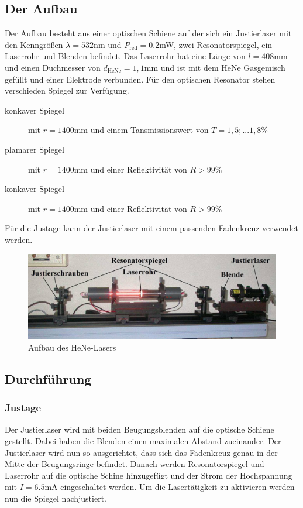 \subsection{Der Aufbau}
Der Aufbau besteht aus einer optischen Schiene auf der sich ein Justierlaser mit den Kenngrößen $\lambda=532$nm und $P_{\text{red}}=0.2$mW, 
zwei Resonatorspiegel, ein Laserrohr und Blenden befindet. Das Laserrohr hat eine Länge von $l=408$mm und einen Duchmesser
von $d_{\text{HeNe}}=1,1$mm und ist mit dem HeNe Gasgemisch gefüllt und einer Elektrode verbunden.
Für den optischen Resonator stehen verschieden Spiegel zur Verfügung.
\begin{description}
    \item[konkaver Spiegel] mit $r=1400$mm und einem Tansmissionswert von $T=1,5;...1,8\%$
    \item[plamarer Spiegel] mit $r=1400$mm und einer Reflektivität von $R>99\%$
    \item[konkaver Spiegel] mit $r=1400$mm und einer Reflektivität von $R>99\%$
    \end{description}
Für die Justage kann der Justierlaser mit einem passenden Fadenkreuz verwendet werden.
\begin{figure}[H]
    \center
    \includegraphics[width=\textwidth]{bilder/laser.jpg}
    \caption{Aufbau des HeNe-Lasers \cite{anleitung}}
\end{figure}

\subsection{Durchführung}
\subsubsection{Justage}
Der Justierlaser wird mit beiden Beugungsblenden auf die optische Schiene gestellt. Dabei haben die Blenden
einen maximalen Abstand zueinander. Der Justierlaser wird nun so ausgerichtet, dass sich das Fadenkreuz genau in der Mitte der Beugungsringe
befindet. Danach werden Resonatorspiegel und Laserrohr auf die optische Schine hinzugefügt und der Strom der Hochspannung mit $I=6.5$mA eingeschaltet werden.
Um die Lasertätigkeit zu aktivieren werden nun die Spiegel nachjustiert. 
